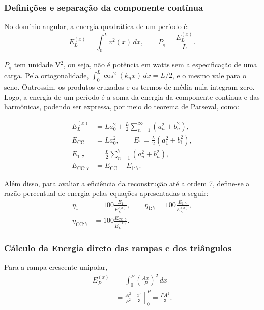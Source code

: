 \subsubsection{Definições e separação da componente contínua}
No domínio angular, a energia quadrática de um período é:
\begin{equation}
    E_L^{(x)}=\int_0^L v^2(x)\,dx, \qquad
    P_{\mathrm{q}}=\frac{E_L^{(x)}}{L}.
\end{equation}

$P_{\mathrm{q}}$ tem unidade V$^2$, ou seja, não é potência em watts sem a
especificação de uma carga. Pela ortogonalidade,
$\int_0^L\cos^2(k_nx)\,dx=L/2$, e o mesmo vale para o seno.
Outrossim, os produtos cruzados e os termos de média nula integram zero.
Logo, a energia de um período é a soma da energia da componente contínua e das harmônicas, podendo ser expressa, por meio do teorema de Parseval, como:

\begin{equation}
    \begin{aligned}
        E_L^{(x)}&=La_0^2+\frac L2\sum_{n=1}^{\infty}(a_n^2+b_n^2), \\
        E_{\mathrm{CC}}&=La_0^2, \qquad
        E_1=\frac L2(a_1^2+b_1^2), \\
        E_{1:7}&=\frac L2\sum_{n=1}^{7}(a_n^2+b_n^2), \\
        E_{\mathrm{CC}:7}&=E_{\mathrm{CC}}+E_{1:7}.
    \end{aligned}
    \label{eq:energias_parseval}
\end{equation}

Além disso, para avaliar a eficiência da reconstrução até a ordem 7, define-se a razão percentual de energia pelas equações apresentadas a seguir:
\begin{equation}
    \begin{aligned}
        \eta_1&=100\frac{E_1}{E_L^{(x)}}, \qquad
        \eta_{1:7}=100\frac{E_{1:7}}{E_L^{(x)}}, \\
        \eta_{\mathrm{CC}:7}&=100\frac{E_{\mathrm{CC}:7}}{E_L^{(x)}}.
    \end{aligned}
\end{equation}

\subsubsection{Cálculo da Energia direto das rampas e dos triângulos}
Para a rampa crescente unipolar,
\begin{equation}
    \begin{aligned}
        E_P^{(x)}&=\int_0^P\left(\frac{Ax}{P}\right)^2\,dx \\
            &=\frac{A^2}{P^2}\left[\frac{x^3}{3}\right]_0^P
            =\frac{PA^2}{3}.
    \end{aligned}
\end{equation}

